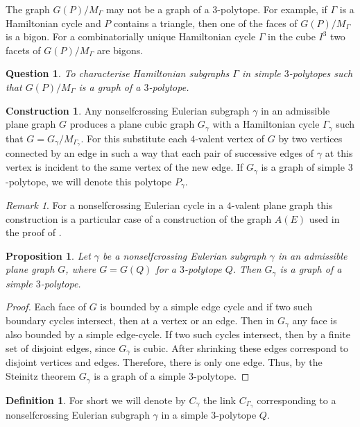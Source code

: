 \documentclass[12pt]{amsart}
\newtheorem{proposition}[formula]{Proposition}
\newtheorem{question}{Question}
\theoremstyle{definition}
\newtheorem{definition}[formula]{Definition}
\newtheorem{construction}[formula]{Construction}
\theoremstyle{remark}
\newtheorem{remark}[formula]{Remark}
\begin{document}
The graph $G(P)/M_{\Gamma}$ may not be a graph of a $3$-polytope. For example, if $\Gamma$ is a Hamiltonian cycle and 
$P$ contains a triangle, then one of the faces of $G(P)/M_{\Gamma}$ is a bigon. For a combinatorially unique Hamiltonian cycle
$\Gamma$ in  the cube $I^3$ two facets of $G(P)/M_{\Gamma}$ are bigons. 

\begin{question}
To characterise Hamiltonian subgraphs $ \Gamma$ in simple $3$-polytopes such that 
$G(P)/M_{\Gamma}$ is a graph of a $3$-polytope. 
\end{question}

\begin{construction}\label{ADC}
Any nonselfcrossing Eulerian subgraph $\gamma$ in an admissible plane graph $G$ 
produces a plane cubic graph $G_\gamma$ with a Hamiltonian cycle $\Gamma_\gamma$ such that 
$G=G_\gamma/M_{\Gamma_\gamma}$. For this substitute each $4$-valent vertex of $G$ by 
two vertices connected by an edge in such a way that each pair of successive edges of $\gamma$ at this vertex 
is incident to the same vertex of the new edge. If $G_\gamma$ is a graph of simple $3$-polytope, we will denote this polytope $P_\gamma$.
\end{construction}
\begin{remark}
For a nonselfcrossing Eulerian cycle in a $4$-valent plane graph this 
construction is a particular case of a construction of the graph $A(E)$ used in the proof of \cite[Theorem 14]{K68b}. 
\end{remark}

\begin{proposition}\label{PGg}
Let $\gamma$ be a nonselfcrossing Eulerian subgraph $\gamma$ in an admissible plane graph $G$,
where $G=G(Q)$ for a $3$-polytope $Q$. Then $G_\gamma$ is a graph of a simple $3$-polytope.
\end{proposition}
\begin{proof}
Each face of $G$ is bounded by a simple edge cycle and if two such boundary cycles intersect, then
at a vertex or an edge. Then in $G_\gamma$ any face is also bounded by a simple edge-cycle. If two such cycles
intersect, then by a finite set of disjoint edges, since $G_\gamma$ is cubic.
After shrinking these edges correspond to disjoint vertices and edges. Therefore, there is only one edge. Thus, by
the Steinitz theorem $G_\gamma$ is a graph of a simple $3$-polytope.
\end{proof}
\begin{definition}
For short we will denote by $C_\gamma$ 
the link $C_{\Gamma_\gamma}$ corresponding to a nonselfcrossing Eulerian subgraph $\gamma$
in a simple $3$-polytope $Q$.
\end{definition}
\end{document}
